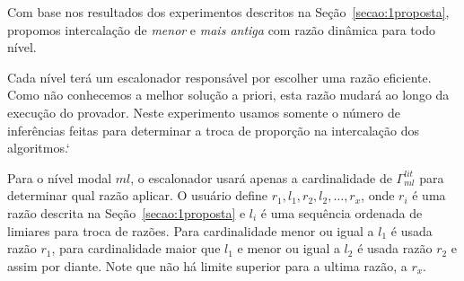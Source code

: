 Com base nos resultados dos experimentos descritos na Seção~\ref{secao:1proposta}, propomos intercalação de \textit{menor} e \textit{mais antiga} com razão dinâmica para todo nível.

Cada nível terá um escalonador responsável por escolher uma razão eficiente. Como não conhecemos a melhor solução a priori, esta razão mudará ao longo da execução do provador. Neste experimento usamos somente o número de inferências feitas para determinar a troca de proporção na intercalação dos algoritmos.`

Para o nível modal $ml$, o escalonador usará apenas a cardinalidade de $\Gamma^{lit}_{ml}$ para determinar qual razão aplicar. O usuário define $r_1, l_1, r_2, l_2, \ldots, r_x$, onde $r_i$ é uma razão descrita na Seção~\ref{secao:1proposta} e $l_i$ é uma sequência ordenada de limiares para troca de razões. Para cardinalidade menor ou igual a $l_1$ é usada razão $r_1$, para cardinalidade maior que $l_1$ e menor ou igual a $l_2$ é usada razão $r_2$ e assim por diante. Note que não há limite superior para a ultima razão, a $r_x$.



